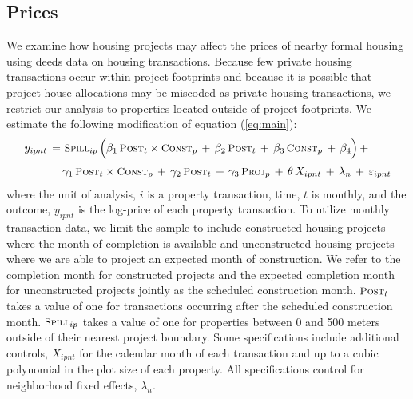 \documentclass[12pt]{article}
\begin{document}
\subsection{Prices}\label{section:resultsprices}


We examine how housing projects may affect the prices of nearby formal housing using deeds data on housing transactions.  Because few private housing transactions occur within project footprints and because it is possible that project house allocations may be miscoded as private housing transactions, we restrict our analysis to properties located outside of project footprints.  We estimate the following modification of equation (\ref{eq:main}):
\begin{align}\label{eq:mainprice}
\begin{split}
\quad y_{ipnt} \, =& \,\, \textsc{\small Spill}_{ip} \, \Big( \beta_1 \, \textsc{\small Post}_{t}\times\textsc{\small Const}_{p} \, + \, \beta_2 \, \textsc{\small Post}_{t} \, + \, \beta_3 \, \textsc{\small Const}_{p} \, +\, \beta_4 \Big) \, + \\[.2em]
& \, \gamma_1 \,  \textsc{\small Post}_{t}\times\textsc{\small Const}_{p} \, + \, \gamma_2 \,\textsc{\small Post}_{t} \, + \, \gamma_3 \,  \textsc{\small Proj}_{p} \, + \, \theta \, X_{ipnt} \, + \, \lambda_n \, + \, \varepsilon_{ipnt} \quad 
\end{split}
\end{align}
\noindent where the unit of analysis, $i$ is a property transaction, time, $t$ is monthly, and the outcome, $y_{ipnt}$ is the log-price of each property transaction.  To utilize monthly transaction data, we limit the sample to include constructed housing projects where the month of completion is available and unconstructed housing projects where we are able to project an expected month of construction.  We refer to the completion month for constructed projects and the expected completion month for unconstructed projects jointly as the scheduled construction month.  $\textsc{\small Post}_{t}$ takes a value of one for transactions occurring after the scheduled construction month.  $\textsc{\small Spill}_{ip}$ takes a value of one for properties between 0 and 500 meters outside of their nearest project boundary.  Some specifications include additional controls, $X_{ipnt}$  for the calendar month of each transaction and up to a cubic polynomial in the plot size of each property.  All specifications control for neighborhood fixed effects, $\lambda_n$.  %
\end{document}
